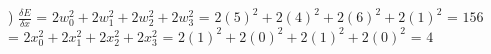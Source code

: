 \documentclass[12pt]{article}
\begin{document}
) {\Large $\frac{\delta E}{\delta x}$} = $2w_0^2 + 2w_1^2 + 2w_2^2 + 2w_3^2$ = $2(5)^2 + 2(4)^2 + 2(6)^2 + 2(1)^2$ = $156$\\[.4em]
 = $2x_0^2 + 2x_1^2 + 2x_2^2 + 2x_3^2$ = $2(1)^2 + 2(0)^2 + 2(1)^2 + 2(0)^2$ = $4$\\[.4em]



\end{document}
